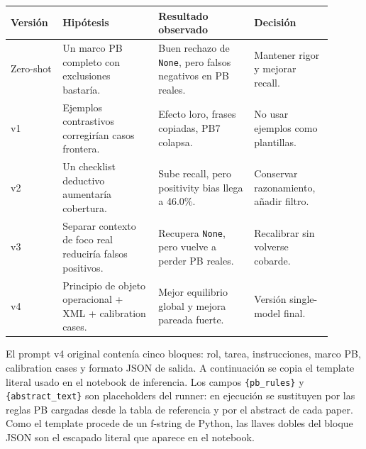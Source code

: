 \begin{center}
\scriptsize
\setlength{\tabcolsep}{4pt}
\renewcommand{\arraystretch}{1.15}
\begin{tabular}{p{0.14\linewidth}p{0.27\linewidth}p{0.27\linewidth}p{0.22\linewidth}}
\toprule
Versión & Hipótesis & Resultado observado & Decisión \\
\midrule
Zero-shot & Un marco PB completo con exclusiones bastaría. & Buen rechazo de \texttt{None}, pero falsos negativos en PB reales. & Mantener rigor y mejorar recall. \\
v1 & Ejemplos contrastivos corregirían casos frontera. & Efecto loro, frases copiadas, PB7 colapsa. & No usar ejemplos como plantillas. \\
v2 & Un checklist deductivo aumentaría cobertura. & Sube recall, pero positivity bias llega a 46.0\%. & Conservar razonamiento, añadir filtro. \\
v3 & Separar contexto de foco real reduciría falsos positivos. & Recupera \texttt{None}, pero vuelve a perder PB reales. & Recalibrar sin volverse cobarde. \\
v4 & Principio de objeto operacional + XML + calibration cases. & Mejor equilibrio global y mejora pareada fuerte. & Versión single-model final. \\
\bottomrule
\end{tabular}
\end{center}

El prompt v4 original contenía cinco bloques: rol, tarea, instrucciones, marco PB, calibration cases y formato JSON de salida. A continuación se copia el template literal usado en el notebook de inferencia. Los campos \texttt{\{pb\_rules\}} y \texttt{\{abstract\_text\}} son placeholders del runner: en ejecución se sustituyen por las reglas PB cargadas desde la tabla de referencia y por el abstract de cada paper. Como el template procede de un f-string de Python, las llaves dobles del bloque JSON son el escapado literal que aparece en el notebook.

